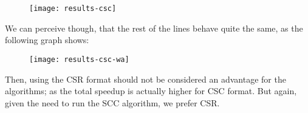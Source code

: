 \begin{figure}[H]
  \centering
  \texttt{[image: results-csc]}
\end{figure}

We can perceive though, that the rest of the lines behave quite the
same, as the following graph shows:

\begin{figure}[H]
  \centering
  \texttt{[image: results-csc-wa]}
\end{figure}

Then, using the CSR format should not be considered an advantage for
the algorithms; as the total speedup is actually higher for CSC
format. But again, given the need to run the SCC algorithm, we prefer
CSR.


